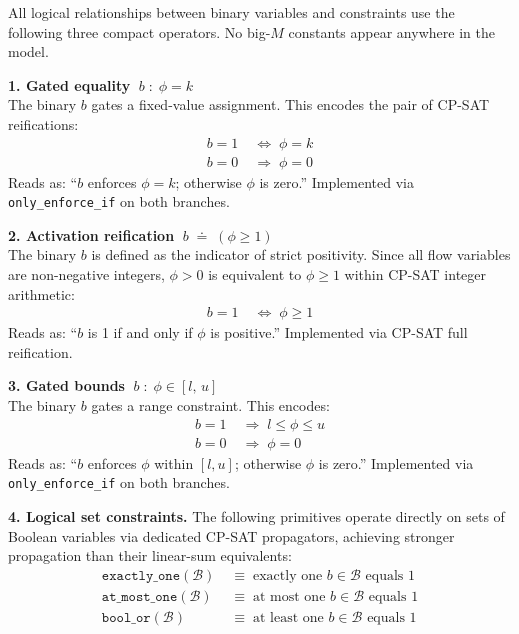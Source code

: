 \begin{convention}
\label{conv:reif}
All logical relationships between binary variables and constraints
use the following three compact operators. No big-$M$ constants
appear anywhere in the model.

\medskip
\noindent\textbf{1. Gated equality} $\;b \;:\; \phi = k$\\
The binary $b$ gates a fixed-value assignment. This encodes the
pair of CP-SAT reifications:
\begin{align*}
  b = 1 &\;\Leftrightarrow\; \phi = k \\
  b = 0 &\;\Rightarrow\;    \phi = 0
\end{align*}
Reads as: ``$b$ enforces $\phi = k$; otherwise $\phi$ is zero.''
Implemented via \texttt{only\_enforce\_if} on both branches.

\medskip
\noindent\textbf{2. Activation reification} $\;b \;\doteq\; (\phi \geq 1)$\\
The binary $b$ is defined as the indicator of strict positivity.
Since all flow variables are non-negative integers, $\phi > 0$
is equivalent to $\phi \geq 1$ within CP-SAT integer arithmetic:
\begin{align*}
  b = 1 &\;\Leftrightarrow\; \phi \geq 1
\end{align*}
Reads as: ``$b$ is 1 if and only if $\phi$ is positive.''
Implemented via CP-SAT full reification.

\medskip
\noindent\textbf{3. Gated bounds} $\;b \;:\; \phi \in [l,\, u]$\\
The binary $b$ gates a range constraint. This encodes:
\begin{align*}
  b = 1 &\;\Rightarrow\; l \leq \phi \leq u \\
  b = 0 &\;\Rightarrow\; \phi = 0
\end{align*}
Reads as: ``$b$ enforces $\phi$ within $[l,u]$; otherwise $\phi$
is zero.'' Implemented via \texttt{only\_enforce\_if} on both
branches.

\medskip
\noindent\textbf{4. Logical set constraints.}
The following primitives operate directly on sets of Boolean
variables via dedicated CP-SAT propagators, achieving stronger
propagation than their linear-sum equivalents:
\begin{align*}
  \texttt{exactly\_one}(\mathcal{B})
    &\;\equiv\; \text{exactly one } b\in\mathcal{B}
      \text{ equals } 1 \\
  \texttt{at\_most\_one}(\mathcal{B})
    &\;\equiv\; \text{at most one } b\in\mathcal{B}
      \text{ equals } 1 \\
  \texttt{bool\_or}(\mathcal{B})
    &\;\equiv\; \text{at least one } b\in\mathcal{B}
      \text{ equals } 1
\end{align*}
\end{convention}

